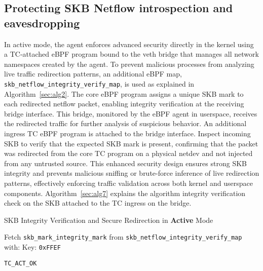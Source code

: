 \documentclass [11pt, proquest] {uwthesis}[2020/02/24]
\begin{document}
\subsection{Protecting SKB Netflow introspection and eavesdropping}
In active mode, the agent enforces advanced security directly in the kernel using a TC-attached eBPF program bound to the veth bridge that manages all network namespaces created by the agent. To prevent malicious processes from analyzing live traffic redirection patterns, an additional eBPF map, \texttt{skb\_netflow\_integrity\_verify\_map}, is used as explained in Algorithm~\ref{sec:alg2}. The core eBPF program assigns a unique SKB mark to each redirected netflow packet, enabling integrity verification at the receiving bridge interface. This bridge, monitored by the eBPF agent in userspace, receives the redirected traffic for further analysis of suspicious behavior.
An additional ingress TC eBPF program is attached to the bridge interface. Inspect incoming SKB to verify that the expected SKB mark is present, confirming that the packet was redirected from the core TC program on a physical netdev and not injected from any untrusted source. This enhanced security design ensures strong SKB integrity and prevents malicious sniffing or brute-force inference of live redirection patterns, effectively enforcing traffic validation across both kernel and userspace components. Algorithm~\ref{sec:alg7} explains the algorithm integrity verification check on the SKB attached to the TC ingress on the bridge.

\begin{algorithm}[H]
\label{sec:alg7}
\caption{SKB Integrity Verification and Secure Redirection in \textbf{Active} Mode}

\small
{}


Fetch \texttt{skb\_mark\_integrity\_mark} from \texttt{skb\_netflow\_integrity\_verify\_map} with:\newline
\quad Key: \texttt{0xFFEF}


\Return \texttt{TC\_ACT\_OK} 
\end{algorithm}
\end{document}
